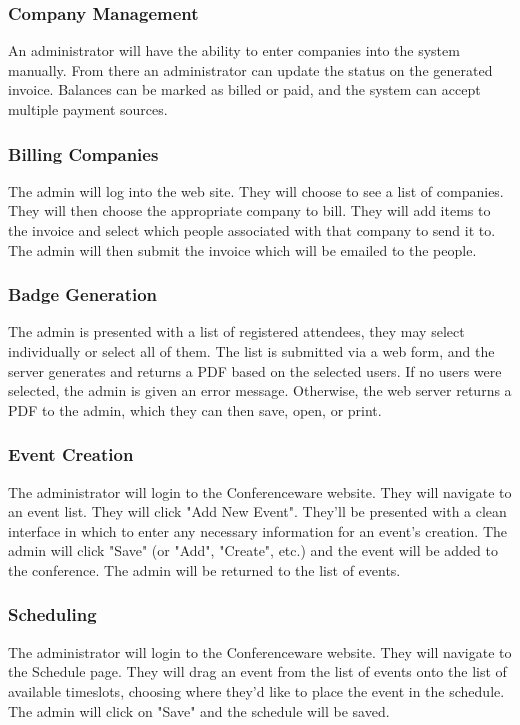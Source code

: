 \documentclass[12pt]{article}
\begin{document}
\subsubsection{Company Management}
An administrator will have the ability to enter companies into the system manually. From there
an administrator can update the status on the generated invoice. Balances can be marked as
billed or paid, and the system can accept multiple payment sources.
\subsubsection{Billing Companies}
The admin will log into the web site. They will choose to see a list of
companies. They will then choose the appropriate company to bill. They will
add items to the invoice and select which people associated with that company
to send it to. The admin will then submit the invoice which will be emailed
to the people.
\subsubsection{Badge Generation}
The admin is presented with a list of registered attendees, they may select
individually or select all of them. The list is submitted via a web form,
and the server generates and returns a PDF based on the selected users. If
no users were selected, the admin is given an error message. Otherwise, the
web server returns a PDF to the admin, which they can then save, open, or
print.
\subsubsection{Event Creation}
The administrator will login to the Conferenceware website.  They will navigate to an event list.  They will click "Add New Event".  They'll be presented with a clean interface in which to enter any necessary information for an event's creation.  The admin will click "Save" (or "Add", "Create", etc.) and the event will be added to the conference.  The admin will be returned to the list of events.
\subsubsection{Scheduling}
The administrator will login to the Conferenceware website.  They will navigate to the Schedule page.  They will drag an event from the list of events onto the list of available timeslots, choosing where they'd like to place the event in the schedule.  The admin will click on "Save" and the schedule will be saved.
\end{document}
